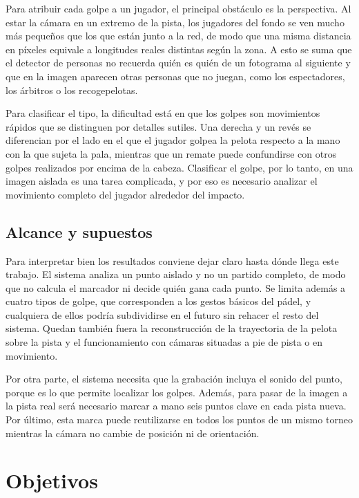 Para atribuir cada golpe a un jugador, el principal obstáculo es la perspectiva.
Al estar la cámara en un extremo de la pista, los jugadores del fondo se ven mucho más pequeños que los que están junto a la red, de modo que una misma distancia en píxeles equivale a longitudes reales distintas según la zona.
A esto se suma que el detector de personas no recuerda quién es quién de un fotograma al siguiente y que en la imagen aparecen otras personas que no juegan, como los espectadores, los árbitros o los recogepelotas.

Para clasificar el tipo, la dificultad está en que los golpes son movimientos rápidos que se distinguen por detalles sutiles.
Una derecha y un revés se diferencian por el lado en el que el jugador golpea la pelota respecto a la mano con la que sujeta la pala, mientras que un remate puede confundirse con otros golpes realizados por encima de la cabeza.
Clasificar el golpe, por lo tanto, en una imagen aislada es una tarea complicada, y por eso es necesario analizar el movimiento completo del jugador alrededor del impacto.

\subsection{Alcance y supuestos}
\label{sec:alcance}

Para interpretar bien los resultados conviene dejar claro hasta dónde llega este trabajo.
El sistema analiza un punto aislado y no un partido completo, de modo que no calcula el marcador ni decide quién gana cada punto.
Se limita además a cuatro tipos de golpe, que corresponden a los gestos básicos del pádel, y cualquiera de ellos podría subdividirse en el futuro sin rehacer el resto del sistema.
Quedan también fuera la reconstrucción de la trayectoria de la pelota sobre la pista y el funcionamiento con cámaras situadas a pie de pista o en movimiento.

Por otra parte, el sistema necesita que la grabación incluya el sonido del punto, porque es lo que permite localizar los golpes.
Además, para pasar de la imagen a la pista real será necesario marcar a mano seis puntos clave en cada pista nueva.
Por último, esta marca puede reutilizarse en todos los puntos de un mismo torneo mientras la cámara no cambie de posición ni de orientación.

\section{Objetivos}
\label{sec:objetivos}

